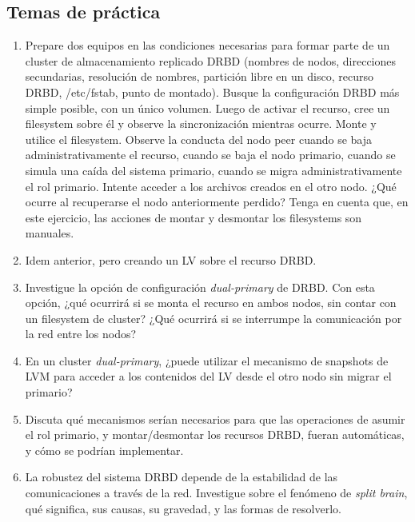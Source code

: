 \subsection{Temas de práctica}
\begin{enumerate}
	\item Prepare dos equipos en las condiciones necesarias para formar parte de un cluster de almacenamiento replicado DRBD (nombres de nodos, direcciones secundarias, resolución de nombres, partición libre en un disco, recurso DRBD, /etc/fstab, punto de montado). Busque la configuración DRBD más simple posible, con un único volumen. Luego de activar el recurso, cree un filesystem sobre él y observe la sincronización mientras ocurre. Monte y utilice el filesystem. Observe la conducta del nodo peer cuando se baja administrativamente el recurso, cuando se baja el nodo primario, cuando se simula una caída del sistema primario, cuando se migra administrativamente el rol primario. Intente acceder a los archivos creados en el otro nodo. ¿Qué ocurre al recuperarse el nodo anteriormente perdido? Tenga en cuenta que, en este ejercicio, las acciones de montar y desmontar los filesystems son manuales.
	\item Idem anterior, pero creando un LV sobre el recurso DRBD.   
	\item Investigue la opción de configuración \textit{dual-primary} de DRBD. Con esta opción, ¿qué ocurrirá si se monta el recurso en ambos nodos, sin contar con un filesystem de cluster? ¿Qué ocurrirá si se interrumpe la comunicación por la red entre los nodos?
	\item En un cluster \textit{dual-primary}, ¿puede utilizar el mecanismo de snapshots de LVM para acceder a los contenidos del LV desde el otro nodo sin migrar el primario?  
	\item Discuta qué mecanismos serían necesarios para que las operaciones de asumir el rol primario, y montar/desmontar los recursos DRBD, fueran automáticas, y cómo se podrían implementar. 
	\item La robustez del sistema DRBD depende de la estabilidad de las comunicaciones a través de la red. Investigue sobre el fenómeno de \textit{split brain}, qué significa, sus causas, su gravedad, y las formas de resolverlo.
\end{enumerate}

